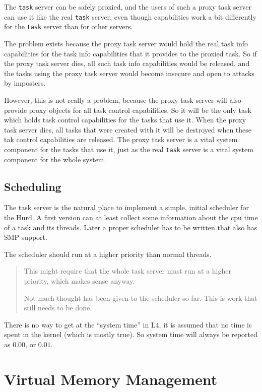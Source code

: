 \documentclass[9pt,a4paper]{extarticle}
\newenvironment{comment}{\footnotesize \begin{quote}}{\end{quote}}
\begin{document}
The \texttt{task} server can be safely proxied, and the users of such
a proxy task server can use it like the real \texttt{task} server,
even though capabilities work a bit differently for the \texttt{task}
server than for other servers.

The problem exists because the proxy task server would hold the real
task info capabilities for the task info capabilities that it provides
to the proxied task.  So if the proxy task server dies, all such task
info capabilities would be released, and the tasks using the proxy
task server would become insecure and open to attacks by imposters.

However, this is not really a problem, because the proxy task server
will also provide proxy objects for all task control capabilities.  So
it will be the only task which holds task control capabilities for the
tasks that use it.  When the proxy task server dies, all tasks that
were created with it will be destroyed when these tak control
capabilities are released.  The proxy task server is a vital system
component for the tasks that use it, just as the real \texttt{task}
server is a vital system component for the whole system.


\subsection{Scheduling}

The task server is the natural place to implement a simple, initial
scheduler for the Hurd.  A first version can at least collect some
information about the cpu time of a task and its threads.  Later a
proper scheduler has to be written that also has SMP support.

The scheduler should run at a higher priority than normal threads.

\begin{comment}
  This might require that the whole task server must run at a higher
  priority, which makes sense anyway.
  
  Not much thought has been given to the scheduler so far.  This is
  work that still needs to be done.
\end{comment}

There is no way to get at the ``system time'' in L4, it is assumed
that no time is spent in the kernel (which is mostly true).  So system
time will always be reported as $0.00$, or $0.01$.


\section{Virtual Memory Management}
\end{document}
